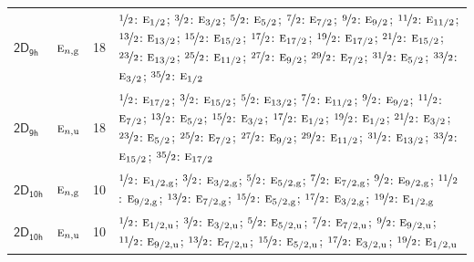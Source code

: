 \documentclass[10pt,a4paper]{article}
\numberwithin{equation}{section}
\newcommand{\grp}[1]{\mathsf{#1}}
\newcommand{\irr}[1]{\text{\normalfont\scshape #1}}
\newcommand{\ptag}[1]{\mathrm{#1}}
\newlength{\fillwidth}\newlength{\cellwidth}\newlength{\colwidth}
\begin{document}
{\begin{longtable}{@{}llr>{\RaggedRight\arraybackslash}p{\fillwidth}@{}}
\href{2D9h.pdf}{$\grp{2D_{9h}}$} & $\irr{e}_{n,\ptag{g}}$ & 18 & $\nicefrac{1}{2}$: $\irr{e}_{1/2}$; $\nicefrac{3}{2}$: $\irr{e}_{3/2}$; $\nicefrac{5}{2}$: $\irr{e}_{5/2}$; $\nicefrac{7}{2}$: $\irr{e}_{7/2}$; $\nicefrac{9}{2}$: $\irr{e}_{9/2}$; $\nicefrac{11}{2}$: $\irr{e}_{11/2}$; $\nicefrac{13}{2}$: $\irr{e}_{13/2}$; $\nicefrac{15}{2}$: $\irr{e}_{15/2}$; $\nicefrac{17}{2}$: $\irr{e}_{17/2}$; $\nicefrac{19}{2}$: $\irr{e}_{17/2}$; $\nicefrac{21}{2}$: $\irr{e}_{15/2}$; $\nicefrac{23}{2}$: $\irr{e}_{13/2}$; $\nicefrac{25}{2}$: $\irr{e}_{11/2}$; $\nicefrac{27}{2}$: $\irr{e}_{9/2}$; $\nicefrac{29}{2}$: $\irr{e}_{7/2}$; $\nicefrac{31}{2}$: $\irr{e}_{5/2}$; $\nicefrac{33}{2}$: $\irr{e}_{3/2}$; $\nicefrac{35}{2}$: $\irr{e}_{1/2}$\\
\href{2D9h.pdf}{$\grp{2D_{9h}}$} & $\irr{e}_{n,\ptag{u}}$ & 18 & $\nicefrac{1}{2}$: $\irr{e}_{17/2}$; $\nicefrac{3}{2}$: $\irr{e}_{15/2}$; $\nicefrac{5}{2}$: $\irr{e}_{13/2}$; $\nicefrac{7}{2}$: $\irr{e}_{11/2}$; $\nicefrac{9}{2}$: $\irr{e}_{9/2}$; $\nicefrac{11}{2}$: $\irr{e}_{7/2}$; $\nicefrac{13}{2}$: $\irr{e}_{5/2}$; $\nicefrac{15}{2}$: $\irr{e}_{3/2}$; $\nicefrac{17}{2}$: $\irr{e}_{1/2}$; $\nicefrac{19}{2}$: $\irr{e}_{1/2}$; $\nicefrac{21}{2}$: $\irr{e}_{3/2}$; $\nicefrac{23}{2}$: $\irr{e}_{5/2}$; $\nicefrac{25}{2}$: $\irr{e}_{7/2}$; $\nicefrac{27}{2}$: $\irr{e}_{9/2}$; $\nicefrac{29}{2}$: $\irr{e}_{11/2}$; $\nicefrac{31}{2}$: $\irr{e}_{13/2}$; $\nicefrac{33}{2}$: $\irr{e}_{15/2}$; $\nicefrac{35}{2}$: $\irr{e}_{17/2}$\\
\href{2D10h.pdf}{$\grp{2D_{10h}}$} & $\irr{e}_{n,\ptag{g}}$ & 10 & $\nicefrac{1}{2}$: $\irr{e}_{1/2,\ptag{g}}$; $\nicefrac{3}{2}$: $\irr{e}_{3/2,\ptag{g}}$; $\nicefrac{5}{2}$: $\irr{e}_{5/2,\ptag{g}}$; $\nicefrac{7}{2}$: $\irr{e}_{7/2,\ptag{g}}$; $\nicefrac{9}{2}$: $\irr{e}_{9/2,\ptag{g}}$; $\nicefrac{11}{2}$: $\irr{e}_{9/2,\ptag{g}}$; $\nicefrac{13}{2}$: $\irr{e}_{7/2,\ptag{g}}$; $\nicefrac{15}{2}$: $\irr{e}_{5/2,\ptag{g}}$; $\nicefrac{17}{2}$: $\irr{e}_{3/2,\ptag{g}}$; $\nicefrac{19}{2}$: $\irr{e}_{1/2,\ptag{g}}$\\
\href{2D10h.pdf}{$\grp{2D_{10h}}$} & $\irr{e}_{n,\ptag{u}}$ & 10 & $\nicefrac{1}{2}$: $\irr{e}_{1/2,\ptag{u}}$; $\nicefrac{3}{2}$: $\irr{e}_{3/2,\ptag{u}}$; $\nicefrac{5}{2}$: $\irr{e}_{5/2,\ptag{u}}$; $\nicefrac{7}{2}$: $\irr{e}_{7/2,\ptag{u}}$; $\nicefrac{9}{2}$: $\irr{e}_{9/2,\ptag{u}}$; $\nicefrac{11}{2}$: $\irr{e}_{9/2,\ptag{u}}$; $\nicefrac{13}{2}$: $\irr{e}_{7/2,\ptag{u}}$; $\nicefrac{15}{2}$: $\irr{e}_{5/2,\ptag{u}}$; $\nicefrac{17}{2}$: $\irr{e}_{3/2,\ptag{u}}$; $\nicefrac{19}{2}$: $\irr{e}_{1/2,\ptag{u}}$\\

\end{longtable}}
\end{document}
